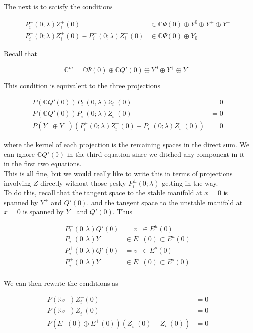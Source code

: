\documentclass[12pt]{article}
\def\R{{\mathbb R}}
\def\C{{\mathbb C}}
\begin{document}
The next is to satisfy the conditions

\begin{align*}
P_i^\pm(0; \lambda) Z_i^\pm(0) &\in \C \Psi(0) \oplus Y^0 \oplus Y^+ \oplus Y^- \\
P_i^+(0; \lambda) Z_i^+(0) - P_i^-(0; \lambda) Z_i^-(0) &\in \C \Psi(0) \oplus Y_0
\end{align*}

Recall that

\[
\C^m = \C \Psi(0) \oplus \C Q'(0) \oplus Y^0 \oplus Y^+ \oplus Y^- 
\]

This condition is equivalent to the three projections

\begin{align*}
P(\C Q'(0)) P_i^-(0; \lambda) Z_i^-(0) &= 0 \\
P(\C Q'(0)) P_i^+(0; \lambda) Z_i^+(0) &= 0 \\
P(Y^+ \oplus Y^-) ( P_i^+(0; \lambda) Z_i^+(0) - P_i^-(0; \lambda) Z_i^-(0) ) &= 0
\end{align*}

where the kernel of each projection is the remaining spaces in the direct sum. We can ignore $\C Q'(0)$ in the third equation since we ditched any component in it in the first two equations.\\

This is all fine, but we would really like to write this in terms of projections involving $Z$ directly without those pesky $P_i^\pm(0; \lambda)$ getting in the way.\\

To do this, recall that the tangent space to the stable manifold at $x = 0$ is spanned by $Y^+$ and $Q'(0)$, and the tangent space to the unstable manifold at $x = 0$ is spanned by $Y^-$ and $Q'(0)$. Thus

\begin{align*}
P_i^-(0; \lambda) Q'(0) &= v^- \in E^u(0) \\
P_i^-(0; \lambda) Y^- &\in E^-(0) \subset E^u(0) \\
P_i^+(0; \lambda) Q'(0) &= v^+ \in E^s(0) \\
P_i^+(0; \lambda) Y^+ &\in E^+(0) \subset E^s(0) \\
\end{align*}

We can then rewrite the conditions as

\begin{align*}
P(\R v^- ) Z_i^-(0) &= 0 \\
P(\R v^+ ) Z_i^+(0) &= 0 \\
P( E^-(0) \oplus E^+(0) ) ( Z_i^+(0) - Z_i^-(0) ) &= 0
\end{align*}
\end{document}
